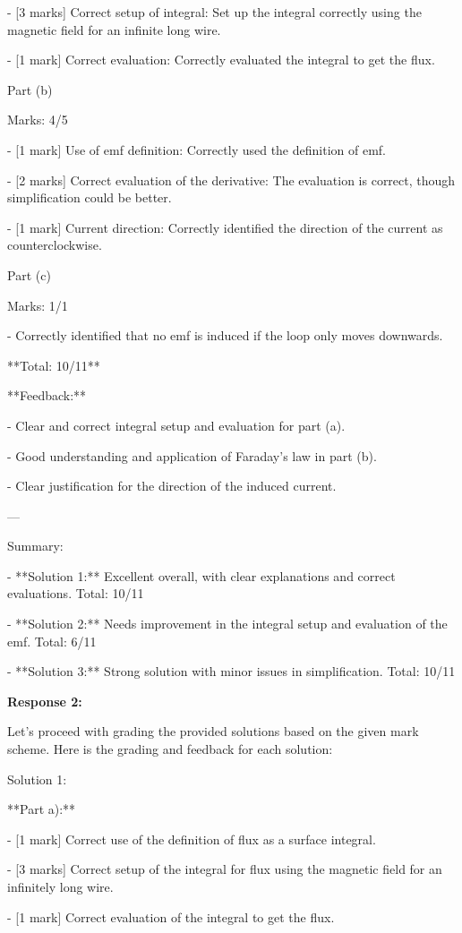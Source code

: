 \documentclass[a4paper,11pt]{article}
\begin{document}
- [3 marks] Correct setup of integral: Set up the integral correctly using the magnetic field for an infinite long wire.

- [1 mark] Correct evaluation: Correctly evaluated the integral to get the flux.

Part (b)

Marks: 4/5

- [1 mark] Use of emf definition: Correctly used the definition of emf.

- [2 marks] Correct evaluation of the derivative: The evaluation is correct, though simplification could be better.

- [1 mark] Current direction: Correctly identified the direction of the current as counterclockwise.

Part (c)

Marks: 1/1

- Correctly identified that no emf is induced if the loop only moves downwards.

**Total: 10/11**

**Feedback:**

- Clear and correct integral setup and evaluation for part (a).

- Good understanding and application of Faraday’s law in part (b).

- Clear justification for the direction of the induced current.

---

Summary:

- **Solution 1:** Excellent overall, with clear explanations and correct evaluations. Total: 10/11

- **Solution 2:** Needs improvement in the integral setup and evaluation of the emf. Total: 6/11

- **Solution 3:** Strong solution with minor issues in simplification. Total: 10/11

\bigskip
\textbf{Response 2:}

Let's proceed with grading the provided solutions based on the given mark scheme. Here is the grading and feedback for each solution:

Solution 1:

**Part a):**

- [1 mark] Correct use of the definition of flux as a surface integral.

- [3 marks] Correct setup of the integral for flux using the magnetic field for an infinitely long wire.

- [1 mark] Correct evaluation of the integral to get the flux.
\end{document}
